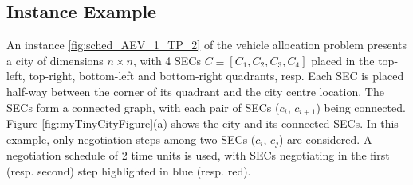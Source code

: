 \subsection{Instance Example}
\label{ccis_instance_example}

An instance \ref{fig:sched_AEV_1_TP_2} of the vehicle allocation problem presents a city of dimensions $n \times n$,
with 4 SECs $C \equiv [ C_1, C_2, C_3, C_4 ]$ placed in the top-left, top-right, bottom-left and bottom-right
quadrants, resp. Each SEC is placed half-way between the corner of its quadrant and the city centre location.
The SECs form a connected graph, with each pair of SECs ($c_i$, $c_{i+1}$) being connected.
Figure \ref{fig:myTinyCityFigure}(a) shows the city and its connected SECs. In this example, only negotiation steps
among two SECs ($c_i$, $c_j$) are considered. A negotiation
schedule of 2 time units is used, with SECs negotiating in the first (resp. second) step highlighted in blue (resp. red).
